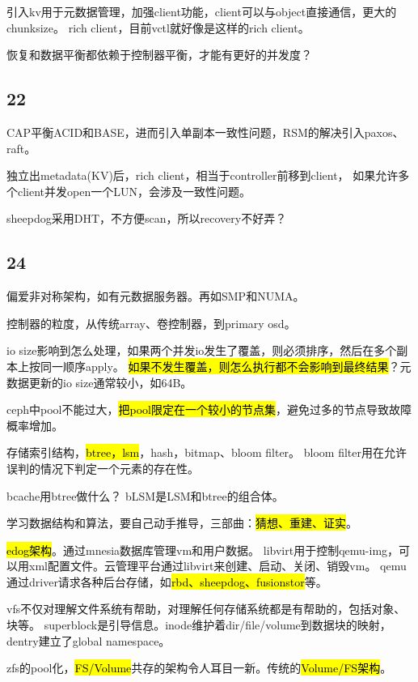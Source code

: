 引入kv用于元数据管理，加强client功能，client可以与object直接通信，更大的chunksize。
rich client，目前vctl就好像是这样的rich client。

恢复和数据平衡都依赖于控制器平衡，才能有更好的并发度？

\subsection{22}

CAP平衡ACID和BASE，进而引入单副本一致性问题，RSM的解决引入paxos、raft。

独立出metadata(KV)后，rich client，相当于controller前移到client，
如果允许多个client并发open一个LUN，会涉及一致性问题。

sheepdog采用DHT，不方便scan，所以recovery不好弄？

\subsection{24}

偏爱非对称架构，如有元数据服务器。再如SMP和NUMA。

控制器的粒度，从传统array、卷控制器，到primary osd。

io size影响到怎么处理，如果两个并发io发生了覆盖，则必须排序，然后在多个副本上按同一顺序apply。
\hl{如果不发生覆盖，则怎么执行都不会影响到最终结果}？元数据更新的io size通常较小，如64B。

ceph中pool不能过大，\hl{把pool限定在一个较小的节点集}，避免过多的节点导致故障概率增加。

存储索引结构，\hl{btree，lsm}，hash，bitmap、bloom filter。
bloom filter用在允许误判的情况下判定一个元素的存在性。

bcache用btree做什么？
bLSM是LSM和btree的组合体。

学习数据结构和算法，要自己动手推导，三部曲：\hl{猜想、重建、证实}。

\hrulefill

\hl{edog架构}。通过mnesia数据库管理vm和用户数据。
libvirt用于控制qemu-img，可以用xml配置文件。云管理平台通过libvirt来创建、启动、关闭、销毁vm。
qemu通过driver请求各种后台存储，如\hl{rbd、sheepdog、fusionstor}等。

\hrulefill

vfs不仅对理解文件系统有帮助，对理解任何存储系统都是有帮助的，包括对象、块等。
superblock是引导信息。inode维护着dir/file/volume到数据块的映射，dentry建立了global namespace。

zfs的pool化，\hl{FS/Volume}共存的架构令人耳目一新。传统的\hl{Volume/FS架构}。

